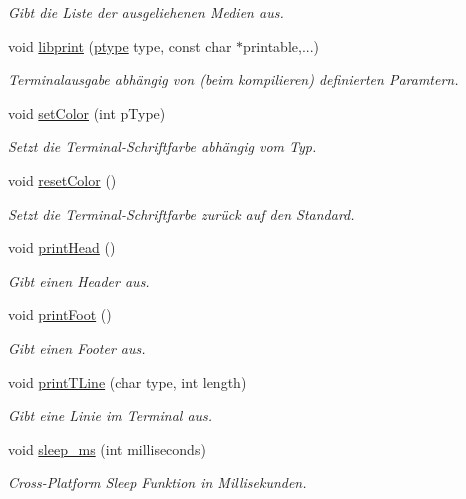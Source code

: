\begin{DoxyCompactItemize}
\begin{DoxyCompactList}\small\item\em Gibt die Liste der ausgeliehenen Medien aus. \end{DoxyCompactList}\item 
void \hyperlink{group___lend_lib_out_ga152ba05f7c1a27f69bd9c243359609c6}{libprint} (\hyperlink{group___lend_lib_out_ga0916607956575302a93dbd21440edc1a}{ptype} type, const char $\ast$printable,...)
\begin{DoxyCompactList}\small\item\em Terminalausgabe abhängig von (beim kompilieren) definierten Paramtern. \end{DoxyCompactList}\item 
void \hyperlink{group___lend_lib_out_ga1b5f37b5e6ac0f38b6933a16e0460579}{set\+Color} (int p\+Type)
\begin{DoxyCompactList}\small\item\em Setzt die Terminal-\/\+Schriftfarbe abhängig vom Typ. \end{DoxyCompactList}\item 
void \hyperlink{group___lend_lib_out_gafe00396766eb6b8ca4674de4c5d3d949}{reset\+Color} ()
\begin{DoxyCompactList}\small\item\em Setzt die Terminal-\/\+Schriftfarbe zurück auf den Standard. \end{DoxyCompactList}\item 
void \hyperlink{group___lend_lib_out_ga903241157072885e802dea85fc6a976c}{print\+Head} ()
\begin{DoxyCompactList}\small\item\em Gibt einen Header aus. \end{DoxyCompactList}\item 
void \hyperlink{group___lend_lib_out_gaa5964f653524972b1bca64e6e8a7622d}{print\+Foot} ()
\begin{DoxyCompactList}\small\item\em Gibt einen Footer aus. \end{DoxyCompactList}\item 
void \hyperlink{group___lend_lib_out_ga5a511942adfe4ce80256d665208eb204}{print\+T\+Line} (char type, int length)
\begin{DoxyCompactList}\small\item\em Gibt eine Linie im Terminal aus. \end{DoxyCompactList}\item 
void \hyperlink{group___lend_lib_out_ga73a8d7e98be85f67961ca682c291033a}{sleep\+\_\+ms} (int milliseconds)
\begin{DoxyCompactList}\small\item\em Cross-\/\+Platform Sleep Funktion in Millisekunden. \end{DoxyCompactList}\end{DoxyCompactItemize}


